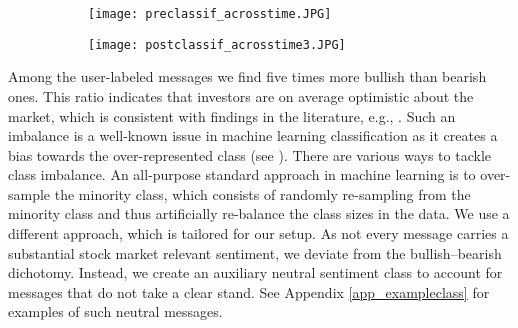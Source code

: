 \begin{figure}[h]
\centering
\begin{subfigure}{0.49\textwidth}
\centering
\texttt{[image: preclassif\_acrosstime.JPG]}
\end{subfigure}
\begin{subfigure}{0.49\textwidth}
\centering
        \texttt{[image: postclassif\_acrosstime3.JPG]}
\end{subfigure}


    \label{fig:classif_time}

\end{figure}

Among the user-labeled messages we find five times more bullish than bearish ones. This ratio indicates that investors are on average optimistic about the market, which is consistent with findings in the literature, e.g., \citet{renault2017intraday}. Such an imbalance is a well-known issue in machine learning classification as it creates a bias towards the over-represented class (see \citet{chawla2004special}). There are various ways to tackle class imbalance. An all-purpose standard approach in machine learning is to over-sample the minority class, which consists of randomly re-sampling from the minority class and thus artificially re-balance the class sizes in the data. We use a different approach, which is tailored for our setup. As not every message carries a substantial stock market relevant sentiment, we deviate from the bullish--bearish dichotomy. Instead, we create an auxiliary neutral sentiment class to account for messages that do not take a clear stand. See Appendix \ref{app_exampleclass} for examples of such neutral messages.

